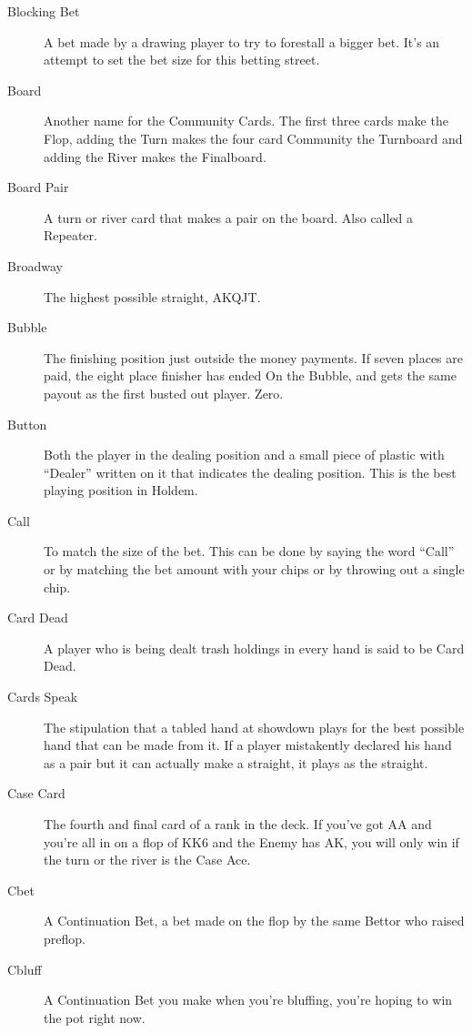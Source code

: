 \begin{description}
\item[Blocking Bet] A bet made by a drawing player to try to forestall
a  bigger bet. It's an attempt to set the bet size for this betting
street.

\item[Board] Another name for the Community Cards. The first three
cards make the Flop, adding the Turn makes the four card Community the
Turnboard and adding the River makes the Finalboard.

\item[Board Pair] A turn or river card that makes a pair on the
board. Also called a Repeater.

\item[Broadway] The highest possible straight, AKQJT.

\item[Bubble] The finishing position just outside the money payments.
If seven places are paid, the eight place finisher has ended On the
Bubble, and gets the same payout as the first busted out player. Zero.

\item[Button] Both the player in the dealing position and a small
piece of plastic with ``Dealer'' written on it that indicates the
dealing position. This is the best playing position in Holdem.

\item[Call] To match the size of the bet. This can be done by saying
the word ``Call'' or by matching the bet amount with your chips or
by throwing out a single chip.

\item[Card Dead] A player who is being dealt trash holdings in every
hand is said to be Card Dead.

\item[Cards Speak] The stipulation that a tabled hand at showdown
plays for the best possible hand that can be made from it. If a player
mistakently declared his hand as a pair but it can actually make a
straight, it plays as the straight.

\item[Case Card] The fourth and final card of a rank in the deck. If
you've got AA and you're all in on a flop of KK6 and the Enemy has AK,
you will only win if the turn or the river is the Case Ace.

\item[Cbet] A Continuation Bet, a bet made on the flop by the same Bettor
who raised preflop.

\item[Cbluff] A Continuation Bet you make when you're bluffing, you're
hoping to win the pot right now.


\end{description}
